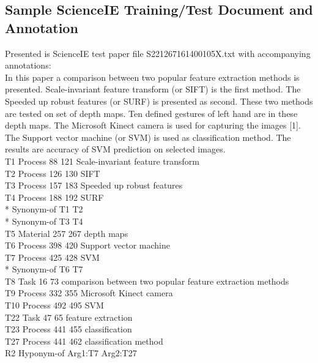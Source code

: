 \begin{appendices}
\appendix

\chapter{Sample ScienceIE Training/Test Document and Annotation}
\label{appendix:scienceiedataeg}
Presented is ScienceIE test paper file S221267161400105X.txt with accompanying annotations:\\

\noindent In this paper a comparison between two popular feature extraction methods is presented. Scale-invariant feature transform (or SIFT) is the first method. The Speeded up robust features (or SURF) is presented as second. These two methods are tested on set of depth maps. Ten defined gestures of left hand are in these depth maps. The Microsoft Kinect camera is used for capturing the images [1]. The Support vector machine (or SVM) is used as classification method. The results are accuracy of SVM prediction on selected images.\\

\noindent T1	Process 88 121	Scale-invariant feature transform\\
T2	Process 126 130	SIFT\\
T3	Process 157 183	Speeded up robust features\\
T4	Process 188 192	SURF\\
*	Synonym-of T1 T2\\
*	Synonym-of T3 T4\\
T5	Material 257 267	depth maps\\
T6	Process 398 420	Support vector machine\\
T7	Process 425 428	SVM\\
*	Synonym-of T6 T7\\
T8	Task 16 73	comparison between two popular feature extraction methods\\
T9	Process 332 355	Microsoft Kinect camera\\
T10	Process 492 495	SVM\\
T22	Task 47 65	feature extraction\\
T23	Process 441 455	classification\\
T27	Process 441 462	classification method\\
R2	Hyponym-of Arg1:T7 Arg2:T27\\


\end{appendices}
